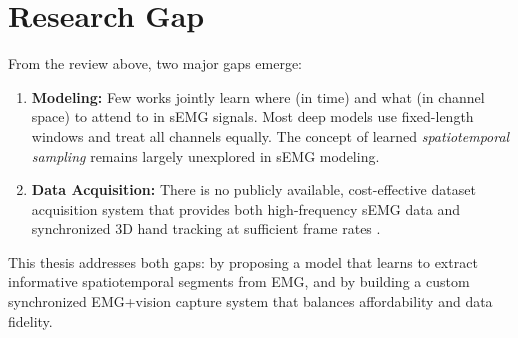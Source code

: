 \section{Research Gap}

From the review above, two major gaps emerge:
\begin{enumerate}
    \item \textbf{Modeling:} Few works jointly learn where (in time) and what (in channel space) to attend to in sEMG signals. Most deep models use fixed-length windows and treat all channels equally. The concept of learned \textit{spatiotemporal sampling} remains largely unexplored in sEMG modeling.
    \item \textbf{Data Acquisition:} There is no publicly available, cost-effective dataset acquisition system that provides both high-frequency sEMG data and synchronized 3D hand tracking at sufficient frame rates \cite{seo2024posture}.
\end{enumerate}

This thesis addresses both gaps: by proposing a model that learns to extract informative spatiotemporal segments from EMG, and by building a custom synchronized EMG+vision capture system that balances affordability and data fidelity.
